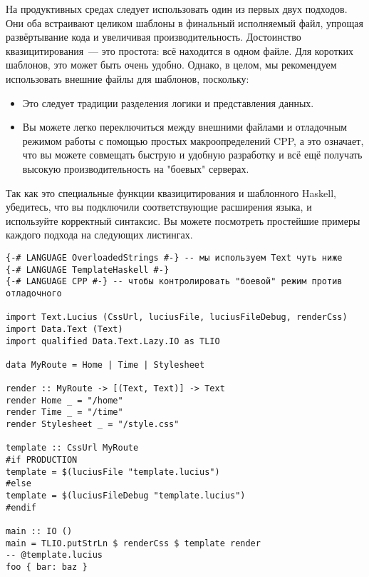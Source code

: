 На продуктивных средах следует использовать один из первых двух подходов.  Они
оба встраивают целиком шаблоны в финальный исполняемый файл, упрощая
развёртывание кода и увеличивая производительность.  Достоинство
квазицитирования~--- это простота: всё находится в одном файле.  Для коротких
шаблонов, это может быть очень удобно. Однако, в целом, мы рекомендуем
использовать внешние файлы для шаблонов, поскольку:
\begin{itemize}
    \item Это следует традиции разделения логики и представления данных.

    \item Вы можете легко переключиться между внешними файлами и отладочным
        режимом работы с помощью простых макроопределений CPP, а это означает,
        что вы можете совмещать быструю и удобную разработку и всё ещё получать
        высокую производительность на "боевых" серверах.
\end{itemize}

Так как это специальные функции квазицитирования и шаблонного Haskell,
убедитесь, что вы подключили соответствующие расширения языка, и используйте
корректный синтаксис. Вы можете посмотреть простейшие примеры каждого подхода
на следующих листингах.


\begin{lstlisting}
{-# LANGUAGE OverloadedStrings #-} -- мы используем Text чуть ниже
{-# LANGUAGE TemplateHaskell #-}
{-# LANGUAGE CPP #-} -- чтобы контролировать "боевой" режим против отладочного

import Text.Lucius (CssUrl, luciusFile, luciusFileDebug, renderCss)
import Data.Text (Text)
import qualified Data.Text.Lazy.IO as TLIO

data MyRoute = Home | Time | Stylesheet

render :: MyRoute -> [(Text, Text)] -> Text
render Home _ = "/home"
render Time _ = "/time"
render Stylesheet _ = "/style.css"

template :: CssUrl MyRoute
#if PRODUCTION
template = $(luciusFile "template.lucius")
#else
template = $(luciusFileDebug "template.lucius")
#endif

main :: IO ()
main = TLIO.putStrLn $ renderCss $ template render
-- @template.lucius
foo { bar: baz }
\end{lstlisting}


